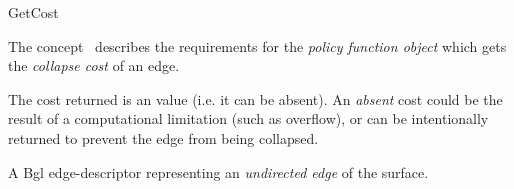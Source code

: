 
\begin{ccRefConcept}{GetCost}


\ccDefinition

The concept \ccRefName\ describes the requirements for the {\em policy function object} which gets the {\em collapse cost} of an edge.

The cost returned is an  value (i.e. it can be absent). An {\em absent} cost could be the result of a computational limitation (such as overflow), or can be intentionally returned to prevent the edge from being collapsed.

\ccRefines
{}

\ccTypes
\ccGlue    
\ccGlue    
\ccGlue    
  {A {\sc Bgl edge-descriptor} representing an {\em undirected edge} of the surface.}
\ccGlue    

\ccCreation
{}  %


\ccOperations


\end{ccRefConcept}
